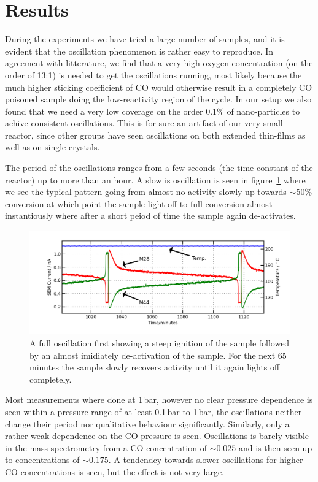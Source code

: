\documentclass[8.5pt,twoside,twocolumn]{article}
\begin{document}
\section{Results}
During the experiments we have tried a large number of samples, and it is evident that the oscillation phenomenon is rather easy to reproduce. In agreement with litterature\cite{Singh2010,Hendriksen2005}, we find that a very high oxygen concentration (on the order of 13:1) is needed to get the oscillations running, most likely because the much higher sticking coefficient of CO would otherwise result in a completely CO poisoned sample doing the low-reactivity region of the cycle. In our setup we also found that we need a very low coverage on the order 0.1\% of nano-particles to achive consistent oscillations. This is for sure an artifact of our very small reactor, since other groups have seen oscillations on both extended thin-films \cite{Singh2010} as well as on single crystals\cite{Hendriksen2005}.

The period of the oscillations ranges from a few seconds (the time-constant of the reactor) up to more than an hour. A slow is oscillation is seen in figure~\ref{fgr:full_oscillation} where we see the typical pattern going from almost no activity slowly up towards $\sim$50\% conversion at which point the sample light off to full conversion almost instantiously where after a short peiod of time the sample again de-activates.
\begin{figure}
  \centering
  \includegraphics[width=17cm]{single_full_oscillation.png}
  \caption{A full oscillation first showing a steep ignition of the sample followed by an almost imidiately de-activation of the sample. For the next 65 minutes the sample slowly recovers activity until it again lights off completely.}
  \label{fgr:full_oscillation}
\end{figure}

Most measurements where done at 1\,bar, however no clear pressure dependence is seen within a pressure range of at least 0.1\,bar to 1\,bar, the oscillations neither change their period nor qualitative behaviour significantly. Similarly, only a rather weak dependence on the CO pressure is seen. Oscillations is barely visible in the mass-spectrometry from a CO-concentration of $\sim0.025$ and is then seen up to concentrations of $\sim0.175$. A tendendcy towards slower oscillations for higher CO-concentrations is seen, but the effect is not very large.
\end{document}

